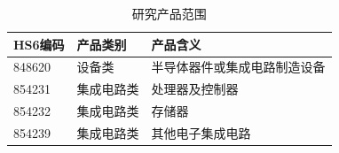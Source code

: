 \begin{table}[H]
\centering
\caption{研究产品范围}
\label{tab:products}
\begin{tabular}{lll}
\toprule
HS6编码 & 产品类别 & 产品含义 \\
\midrule
848620 & 设备类 & 半导体器件或集成电路制造设备 \\
854231 & 集成电路类 & 处理器及控制器 \\
854232 & 集成电路类 & 存储器 \\
854239 & 集成电路类 & 其他电子集成电路 \\
\bottomrule
\end{tabular}
\end{table}
